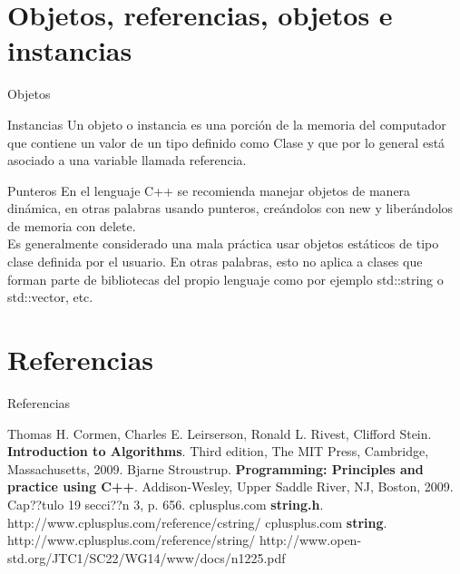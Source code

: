 \documentclass[aspectratio=169]{beamer}
\begin{document}
\section{Objetos, referencias, objetos e instancias}
\begin{frame}{Objetos}
\begin{block}{Instancias}
Un objeto o instancia es una porción de la memoria del computador que contiene un valor de un tipo definido como Clase y que por lo general está asociado a una variable llamada referencia.
\end{block}
\begin{block}{Punteros}
En el lenguaje C++ se recomienda manejar objetos de manera dinámica, en otras palabras usando punteros, creándolos con \alert{new} y liberándolos de memoria con \alert{delete}. \\
Es generalmente considerado una mala práctica usar objetos estáticos de tipo clase definida por el usuario. En otras palabras, esto no aplica a clases que forman parte de bibliotecas del propio lenguaje como por ejemplo std::string o std::vector, etc.
\end{block}
\end{frame}
\section{Referencias}
\begin{frame}{Referencias}
\begin{thebibliography}{9}
Thomas H. Cormen, Charles E. Leirserson, Ronald L. Rivest, Clifford Stein.
\textbf{Introduction to Algorithms}.
Third edition, The MIT Press, Cambridge, Massachusetts, 2009.
Bjarne Stroustrup.
\textbf{Programming: Principles and practice using C++}.
Addison-Wesley, Upper Saddle River, NJ, Boston, 2009. Cap??tulo 19 secci??n 3, p. 656.
cplusplus.com
\textbf{string.h}. http://www.cplusplus.com/reference/cstring/
cplusplus.com
\textbf{string}. http://www.cplusplus.com/reference/string/
http://www.open-std.org/JTC1/SC22/WG14/www/docs/n1225.pdf
\end{thebibliography}
\end{frame}
\end{document}
